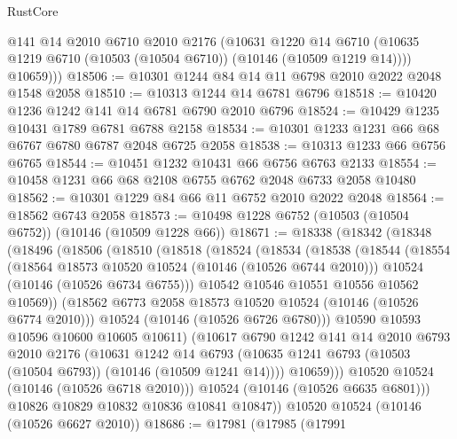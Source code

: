 \begin{lexlean}{RustCore}
\begin{coremodule}
          @141
          @14
          @2010
          @6710
          @2010
          @2176
          (@10631
            @1220
            @14
            @6710
            (@10635 @1219 @6710 (@10503 (@10504 @6710)) (@10146 (@10509 @1219 @14))))
          @10659)))
@18506 := @10301 @1244 @84 @14 @11 @6798 @2010 @2022 @2048 @1548 @2058
@18510 := @10313 @1244 @14 @6781 @6796
@18518 := @10420 @1236 @1242 @141 @14 @6781 @6790 @2010 @6796
@18524 := @10429 @1235 @10431 @1789 @6781 @6788 @2158
@18534 := @10301 @1233 @1231 @66 @68 @6767 @6780 @6787 @2048 @6725 @2058
@18538 := @10313 @1233 @66 @6756 @6765
@18544 := @10451 @1232 @10431 @66 @6756 @6763 @2133
@18554 := @10458 @1231 @66 @68 @2108 @6755 @6762 @2048 @6733 @2058 @10480
@18562 := @10301 @1229 @84 @66 @11 @6752 @2010 @2022 @2048
@18564 := @18562 @6743 @2058
@18573 := @10498 @1228 @6752 (@10503 (@10504 @6752)) (@10146 (@10509 @1228 @66))
@18671 := @18338
    (@18342
      (@18348
        (@18496
          (@18506
            (@18510
              (@18518
                (@18524
                  (@18534
                    (@18538
                      (@18544
                        (@18554
                          (@18564 @18573 @10520 @10524 (@10146 (@10526 @6744 @2010)))
                          @10524
                          (@10146 (@10526 @6734 @6755)))
                        @10542
                        @10546
                        @10551
                        @10556
                        @10562
                        @10569))
                    (@18562 @6773 @2058 @18573 @10520 @10524 (@10146 (@10526 @6774 @2010)))
                    @10524
                    (@10146 (@10526 @6726 @6780)))
                  @10590
                  @10593
                  @10596
                  @10600
                  @10605
                  @10611)
                (@10617
                  @6790
                  @1242
                  @141
                  @14
                  @2010
                  @6793
                  @2010
                  @2176
                  (@10631
                    @1242
                    @14
                    @6793
                    (@10635 @1241 @6793 (@10503 (@10504 @6793)) (@10146 (@10509 @1241 @14))))
                  @10659)))
            @10520
            @10524
            (@10146 (@10526 @6718 @2010)))
          @10524
          (@10146 (@10526 @6635 @6801)))
        @10826
        @10829
        @10832
        @10836
        @10841
        @10847))
    @10520
    @10524
    (@10146 (@10526 @6627 @2010))
@18686 := @17981
    (@17985
      (@17991

\end{coremodule}
\end{lexlean}
